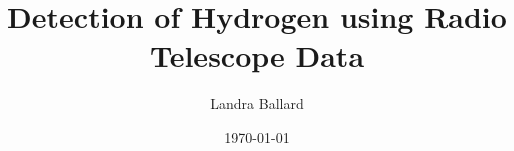 \documentclass{article}
\author{Landra Ballard}
\title{Detection of Hydrogen using Radio Telescope Data}
\date{\today}
\begin{document}
\maketitle

\begin{abstract}

\end{abstract}








\clearpage



\clearpage



\end{document}
